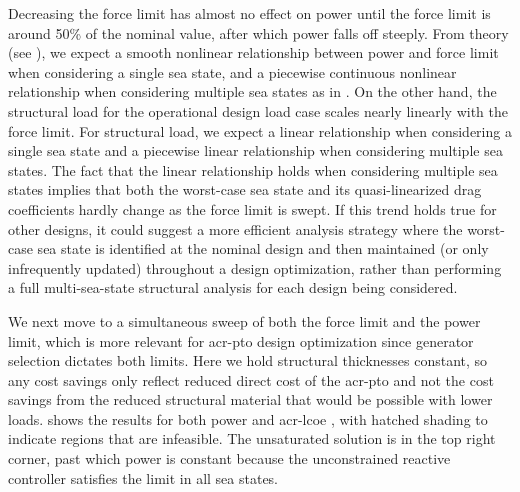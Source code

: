 \documentclass[a4paper,fleqn,colorlinks,unicode,lineno]{cas-dc} %
\begin{document}
Decreasing the force limit has almost no effect on power until the force limit is around 50\% of the nominal value, after which power falls off steeply.
\ifdefined\DISSERTATION
    From theory (see ), we expect a smooth nonlinear relationship between power and force limit when considering a single sea state, and a piecewise continuous nonlinear relationship when considering multiple sea states as in .
\fi
On the other hand, the structural load for the operational design load case scales nearly linearly with the force limit.
\ifdefined\DISSERTATION
    For structural load, we expect a linear relationship when considering a single sea state and a piecewise linear relationship when considering multiple sea states.
    The fact that the linear relationship holds when considering multiple sea states implies that both the worst-case sea state and its quasi-linearized drag coefficients hardly change as the force limit is swept.
    If this trend holds true for other designs, it could suggest a more efficient analysis strategy where the worst-case sea state is identified at the nominal design and then maintained (or only infrequently updated) throughout a design optimization, rather than performing a full multi-sea-state structural analysis for each design being considered.
\fi

We next move to a simultaneous sweep of both the force limit and the power limit, which is more relevant for \gls{acr-pto} design optimization since generator selection dictates both limits.
\ifdefined\DISSERTATION
    Here we hold structural thicknesses constant, so any cost savings only reflect reduced direct cost of the \gls{acr-pto} and not the cost savings from the reduced structural material that would be possible with lower loads.
\fi
{} shows the results for both power and \gls{acr-lcoe} , with hatched shading to indicate regions that are infeasible.
\ifdefined\DISSERTATION
    The unsaturated solution is in the top right corner, past which power is constant because the unconstrained reactive controller satisfies the limit in all sea states.
\fi
\end{document}
